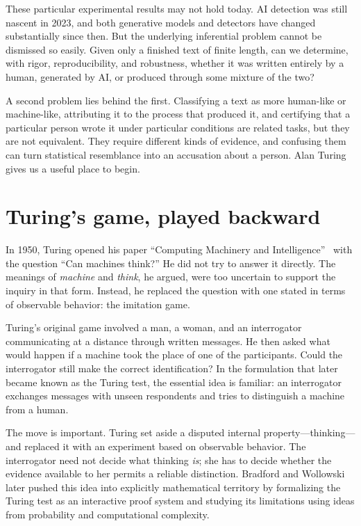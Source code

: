 \documentclass[pdflatex,sn-mathphys-num]{sn-jnl}
\begin{document}
These particular experimental results may not hold today. AI detection was still nascent in 2023, and both generative models and 
detectors have changed substantially since then. But the underlying inferential problem cannot be dismissed so easily. Given only 
a finished text of finite length, can we determine, with rigor, reproducibility, and robustness, whether it was written entirely by a human,
 generated by AI, or produced through some mixture of the two?

A second problem lies behind the first. Classifying a text as more human-like or machine-like, attributing it to the process that produced 
it, and certifying that a particular person wrote it under particular conditions are related tasks, but they are not equivalent. They require
different kinds of evidence, and confusing them can turn statistical resemblance into an accusation about a person. Alan Turing gives us 
a useful place to begin.

\section*{Turing's game, played backward}
In 1950, Turing opened his paper ``Computing Machinery and Intelligence''~\cite{Turing1950} with the question ``Can machines think?''
He did not try to answer it directly. The meanings of \emph{machine} and \emph{think}, he argued, were too uncertain to support the inquiry in that form. 
Instead, he replaced the question with one stated in terms of observable behavior: the imitation game.

Turing's original game involved a man, a woman, and an interrogator communicating at a distance through written messages. He then asked what would 
happen if a machine took the place of one of the participants. Could the interrogator still make the correct identification? In the formulation that later 
became known as the Turing test, the essential idea is familiar: an interrogator exchanges messages with unseen respondents and tries to distinguish a 
machine from a human.

The move is important. Turing set aside a disputed internal property---thinking---and replaced it with an experiment based on observable behavior. The 
interrogator need not decide what thinking \emph{is}; she has to decide whether the evidence available to her permits a reliable distinction. Bradford and 
Wollowski~\cite{Bradford1995} later pushed this idea into explicitly mathematical territory by formalizing the Turing test as an interactive proof system and 
studying its limitations using ideas from probability and computational complexity.
\end{document}

